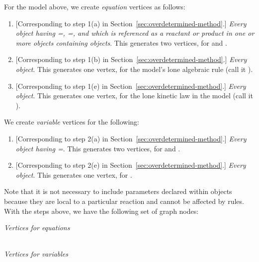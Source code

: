 For the model above, we create \emph{equation} vertices as
follows:
\begin{enumerate}\setlength{\parskip}{0.2ex}
  
\item{} [Corresponding to step 1(a) in
  Section~\ref{sec:overdetermined-method}.]  \emph{Every \Species
    object having =,
    =, and which is referenced as a
    reactant or product in one or more \Reaction objects
    containing \KineticLaw objects}.  This generates two vertices,
  for  and .
  
\item{} [Corresponding to step 1(b)
  in Section~\ref{sec:overdetermined-method}.] \emph{Every
    \AlgebraicRule object}.  This generates one vertex, for the
  model's lone algebraic rule (call it ).
  
\item{} [Corresponding to step 1(e)
  in Section~\ref{sec:overdetermined-method}.] \emph{Every \KineticLaw
    object}.  This generates one vertex, for the lone kinetic law
  in the model (call it ).

\end{enumerate}
We create \emph{variable} vertices for the following:
\begin{enumerate}
  
\item{} [Corresponding to step 2(a)
  in Section~\ref{sec:overdetermined-method}.] \emph{Every \Species
    object having =}.  This generates
  two vertices, for  and .
  
\item{} [Corresponding to step 2(e)
  in Section~\ref{sec:overdetermined-method}.] \emph{Every \Reaction
    object}.  This generates one vertex, for .

\end{enumerate}

Note that it is not necessary to include parameters declared
within \KineticLaw objects because they are local to a particular
reaction and cannot be affected by rules.  With the steps above,
we have the following set of graph nodes:
\begin{center}
\emph{Vertices for equations}\\[10pt]
  \\[5pt]
\emph{Vertices for variables}
\end{center}

